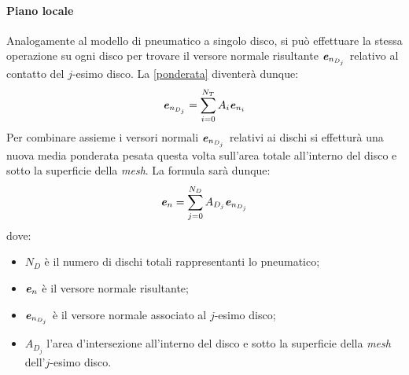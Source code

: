 \paragraph{Piano locale}
Analogamente al modello di pneumatico a singolo disco, si può effettuare la stessa operazione su ogni disco per trovare il versore normale risultante $\textbf{\textit{e}}_{n_{D_j}}$ relativo al contatto del $j$-esimo disco. La \eqref{ponderata} diventerà dunque:
%
\begin{equation}
\textbf{\textit{e}}_{n_{D_j}} = \sum_{i=0}^{N_T}A_i\textbf{\textit{e}}_{n_i}
\end{equation}
%
Per combinare assieme i versori normali $\textbf{\textit{e}}_{n_{D_j}}$ relativi ai dischi si effetturà una nuova media ponderata pesata questa volta sull'area totale all'interno del disco e sotto la superficie della \textit{mesh}. La formula sarà dunque:
%
\begin{equation}
\textbf{\textit{e}}_n = \sum_{j=0}^{N_D}A_{D_j}\textbf{\textit{e}}_{n_{D_j}}
\end{equation}
%
dove:
\begin{itemize}
	\item $N_D$ è il numero di dischi totali rappresentanti lo pneumatico;
	\item $\textbf{\textit{e}}_n$ è il versore normale risultante;
	\item $\textbf{\textit{e}}_{n_{D_j}}$ è il versore normale associato al $j$-esimo disco;
	\item $A_{D_j}$ l'area d'intersezione all'interno del disco e sotto la superficie della \textit{mesh} dell'$j$-esimo disco.
\end{itemize}

